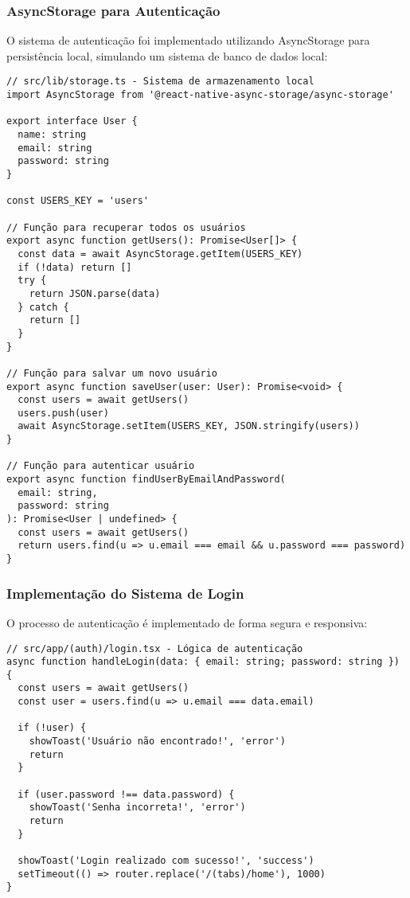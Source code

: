 \subsubsection{AsyncStorage para Autenticação}

O sistema de autenticação foi implementado utilizando AsyncStorage para persistência local, simulando um sistema de banco de dados local:

\begin{verbatim}
// src/lib/storage.ts - Sistema de armazenamento local
import AsyncStorage from '@react-native-async-storage/async-storage'

export interface User {
  name: string
  email: string
  password: string
}

const USERS_KEY = 'users'

// Função para recuperar todos os usuários
export async function getUsers(): Promise<User[]> {
  const data = await AsyncStorage.getItem(USERS_KEY)
  if (!data) return []
  try {
    return JSON.parse(data)
  } catch {
    return []
  }
}

// Função para salvar um novo usuário
export async function saveUser(user: User): Promise<void> {
  const users = await getUsers()
  users.push(user)
  await AsyncStorage.setItem(USERS_KEY, JSON.stringify(users))
}

// Função para autenticar usuário
export async function findUserByEmailAndPassword(
  email: string,
  password: string
): Promise<User | undefined> {
  const users = await getUsers()
  return users.find(u => u.email === email && u.password === password)
}
\end{verbatim}

\subsubsection{Implementação do Sistema de Login}

O processo de autenticação é implementado de forma segura e responsiva:

\begin{verbatim}
// src/app/(auth)/login.tsx - Lógica de autenticação
async function handleLogin(data: { email: string; password: string }) {
  const users = await getUsers()
  const user = users.find(u => u.email === data.email)
  
  if (!user) {
    showToast('Usuário não encontrado!', 'error')
    return
  }
  
  if (user.password !== data.password) {
    showToast('Senha incorreta!', 'error')
    return
  }
  
  showToast('Login realizado com sucesso!', 'success')
  setTimeout(() => router.replace('/(tabs)/home'), 1000)
}
\end{verbatim}

